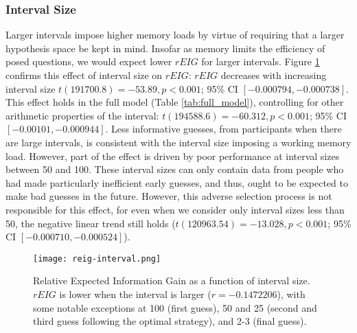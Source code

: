 \documentclass[10pt,letterpaper]{article}
\newcommand{\nums}[1]{\num[scientific-notation = true]{#1}}
\begin{document}
\subsubsection{Interval Size}
Larger intervals impose higher memory loads by virtue of requiring that a larger hypothesis space be kept in mind. Insofar as memory limits the efficiency of posed questions, we would expect lower $rEIG$ for larger intervals.
Figure \ref{fig:reig-interval} confirms this effect of interval size on $rEIG$: $rEIG$ decreases with increasing interval size $t(191700.8) = -53.89, p<0.001$; 95\% CI $[\nums{-0.000794}, \nums{-0.000738}]$. This effect holds in the full model (Table \ref{tab:full_model}), controlling for other arithmetic properties of the interval: $t(194588.6) = -60.312, p<0.001$; 95\% CI $[\nums{-0.00101}, \nums{-0.000944}]$. 
Less informative guesses, from participants when there are large intervals, is consistent with the interval size imposing a working memory load. However, part of the effect is driven by poor performance at interval sizes between 50 and 100. These interval sizes can only contain data from people who had made particularly inefficient early guesses, and thus, ought to be expected to make bad guesses in the future. However, this adverse selection process is not responsible for this effect, for even when we consider only interval sizes less than 50, the negative linear trend still holds ($t(120963.54)=-13.028, p<0.001$; 95\% CI $[\nums{-0.000710}, \nums{-0.000524}]$).

\begin{figure}[h]
    \begin{center}
    \texttt{[image: reig-interval.png]}
    \end{center}
    \vspace{-6mm}
    \caption{Relative Expected Information Gain as a function of interval size. $rEIG$ is lower when the interval is larger ($r = \num{-0.1472206}$), with some notable exceptions at 100 (first guess), 50 and 25 (second and third guess following the optimal strategy), and 2-3 (final guess).}
    \label{fig:reig-interval}
\end{figure}
\end{document}

